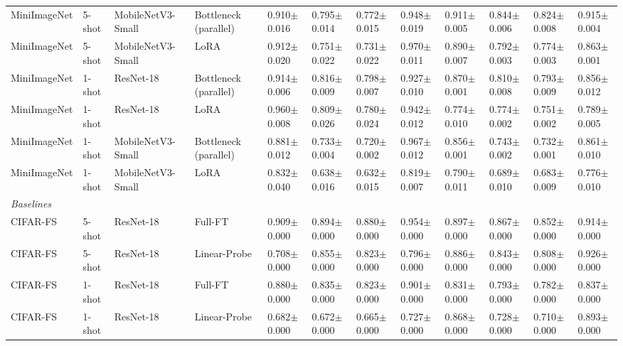 \begin{table}[t]
\begin{tabular}{llllllllllll}
MiniImageNet & 5-shot & MobileNetV3-Small & Bottleneck (parallel) & 0.910$\pm$0.016 & 0.795$\pm$0.014 & 0.772$\pm$0.015 & 0.948$\pm$0.019 & 0.911$\pm$0.005 & 0.844$\pm$0.006 & 0.824$\pm$0.008 & 0.915$\pm$0.004 \\
MiniImageNet & 5-shot & MobileNetV3-Small & LoRA & 0.912$\pm$0.020 & 0.751$\pm$0.022 & 0.731$\pm$0.022 & 0.970$\pm$0.011 & 0.890$\pm$0.007 & 0.792$\pm$0.003 & 0.774$\pm$0.003 & 0.863$\pm$0.001 \\
MiniImageNet & 1-shot & ResNet-18 & Bottleneck (parallel) & 0.914$\pm$0.006 & 0.816$\pm$0.009 & 0.798$\pm$0.007 & 0.927$\pm$0.010 & 0.870$\pm$0.001 & 0.810$\pm$0.008 & 0.793$\pm$0.009 & 0.856$\pm$0.012 \\
MiniImageNet & 1-shot & ResNet-18 & LoRA & 0.960$\pm$0.008 & 0.809$\pm$0.026 & 0.780$\pm$0.024 & 0.942$\pm$0.012 & 0.774$\pm$0.010 & 0.774$\pm$0.002 & 0.751$\pm$0.002 & 0.789$\pm$0.005 \\
MiniImageNet & 1-shot & MobileNetV3-Small & Bottleneck (parallel) & 0.881$\pm$0.012 & 0.733$\pm$0.004 & 0.720$\pm$0.002 & 0.967$\pm$0.012 & 0.856$\pm$0.001 & 0.743$\pm$0.002 & 0.732$\pm$0.001 & 0.861$\pm$0.010 \\
MiniImageNet & 1-shot & MobileNetV3-Small & LoRA & 0.832$\pm$0.040 & 0.638$\pm$0.016 & 0.632$\pm$0.015 & 0.819$\pm$0.007 & 0.790$\pm$0.011 & 0.689$\pm$0.010 & 0.683$\pm$0.009 & 0.776$\pm$0.010 \\
\midrule
\multicolumn{12}{l}{\textit{Baselines}} \\
\midrule
CIFAR-FS & 5-shot & ResNet-18 & Full-FT & 0.909$\pm$0.000 & 0.894$\pm$0.000 & 0.880$\pm$0.000 & 0.954$\pm$0.000 & 0.897$\pm$0.000 & 0.867$\pm$0.000 & 0.852$\pm$0.000 & 0.914$\pm$0.000 \\
CIFAR-FS & 5-shot & ResNet-18 & Linear-Probe & 0.708$\pm$0.000 & 0.855$\pm$0.000 & 0.823$\pm$0.000 & 0.796$\pm$0.000 & 0.886$\pm$0.000 & 0.843$\pm$0.000 & 0.808$\pm$0.000 & 0.926$\pm$0.000 \\
CIFAR-FS & 1-shot & ResNet-18 & Full-FT & 0.880$\pm$0.000 & 0.835$\pm$0.000 & 0.823$\pm$0.000 & 0.901$\pm$0.000 & 0.831$\pm$0.000 & 0.793$\pm$0.000 & 0.782$\pm$0.000 & 0.837$\pm$0.000 \\
CIFAR-FS & 1-shot & ResNet-18 & Linear-Probe & 0.682$\pm$0.000 & 0.672$\pm$0.000 & 0.665$\pm$0.000 & 0.727$\pm$0.000 & 0.868$\pm$0.000 & 0.728$\pm$0.000 & 0.710$\pm$0.000 & 0.893$\pm$0.000 \\
\bottomrule
\end{tabular}
\end{table}
